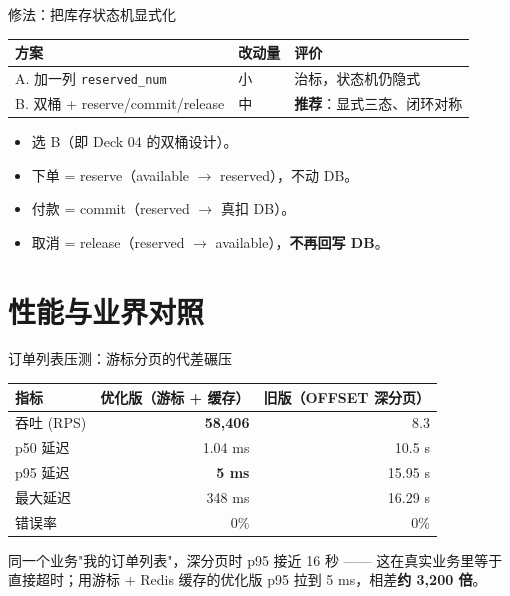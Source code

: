 \begin{frame}{修法：把库存状态机显式化}
\begin{tabular}{@{}lll@{}}
\toprule
方案 & 改动量 & 评价 \\
\midrule
A. 加一列 \texttt{reserved\_num} & 小 & 治标，状态机仍隐式 \\
B. 双桶 + reserve/commit/release & 中 & \textbf{推荐}：显式三态、闭环对称 \\
\bottomrule
\end{tabular}
\vspace{2mm}
\begin{itemize}
  \item 选 B（即 Deck 04 的双桶设计）。
  \item 下单 = reserve（available $\to$ reserved），不动 DB。
  \item 付款 = commit（reserved $\to$ 真扣 DB）。
  \item 取消 = release（reserved $\to$ available），\textbf{不再回写 DB}。
\end{itemize}
\end{frame}

\section{性能与业界对照}

\begin{frame}{订单列表压测：游标分页的代差碾压}
\begin{tabular}{@{}lrr@{}}
\toprule
指标 & 优化版（游标 + 缓存） & 旧版（OFFSET 深分页） \\
\midrule
吞吐 (RPS) & \textbf{58,406} & 8.3 \\
p50 延迟 & 1.04 ms & 10.5 s \\
p95 延迟 & \textbf{5 ms} & 15.95 s \\
最大延迟 & 348 ms & 16.29 s \\
错误率 & 0\% & 0\% \\
\bottomrule
\end{tabular}
\vspace{2mm}
\small 同一个业务"我的订单列表"，深分页时 p95 接近 16 秒 —— 这在真实业务里等于直接超时；用游标 + Redis 缓存的优化版 p95 拉到 5 ms，相差\textbf{约 3,200 倍}。
\end{frame}

